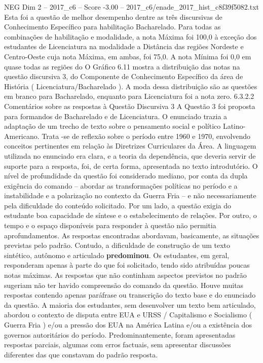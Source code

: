 \begin{textsample}{NEG Dim 2 – 2017\_c6 – Score -3.00 – 2017\_c6/enade\_2017\_hist\_c8f39f5082.txt}
Esta foi a questão de melhor desempenho dentre as três discursivas de Conhecimento Específico para habilitação Bacharelado.
Para todas as combinações de habilitação e modalidade, a nota Máxima foi 100,0 à exceção dos estudantes de Licenciatura na modalidade a Distância das regiões Nordeste e Centro-Oeste cuja nota Máxima, em ambas, foi 75,0.
A nota Mínima foi 0,0 em quase todas as regiões do O Gráfico 6.11 mostra a distribuição das notas na questão discursiva 3, do Componente de Conhecimento Específico da área de História ( Licenciatura/Bacharelado ).
A moda dessa distribuição são as questões em branco para Bacharelado, enquanto para Licenciatura foi a nota zero. 6.3.2.2 Comentários sobre as respostas à Questão Discursiva 3 A Questão 3 foi proposta para formandos de Bacharelado e de Licenciatura.
O enunciado trazia a adaptação de um trecho de texto sobre o pensamento social e político Latino-Americano.
Trata -se de reflexão sobre o período entre 1960 e 1970, envolvendo conceitos pertinentes em relação às Diretrizes Curriculares da Área.
A linguagem utilizada no enunciado era clara, e a teoria da dependência, que deveria servir de suporte para a resposta, foi, de certa forma, apresentada no texto introdutório.
O nível de profundidade da questão foi considerado mediano, por conta da dupla exigência do comando – abordar as transformações políticas no período e a instabilidade e a polarização no contexto da Guerra Fria – e não necessariamente pela dificuldade do conteúdo solicitado.
Por um lado, a questão exigia do estudante boa capacidade de síntese e o estabelecimento de relações.
Por outro, o tempo e o espaço disponíveis para responder à questão não permitia aprofundamentos.
As respostas encontradas abordavam, basicamente, as situações previstas pelo padrão.
Contudo, a dificuldade de construção de um texto sintético, autônomo e articulado \textbf{predominou}.
Os estudantes, em geral, responderam apenas à parte do que foi solicitado, tendo sido atribuídas poucas notas máximas.
As respostas que não continham aspectos previstos no padrão sugeriam não ter havido compreensão do comando da questão.
Houve muitas respostas contendo apenas paráfrase ou transcrição do texto base e do enunciado da questão.
A maioria dos estudantes, sem desenvolver um texto bem articulado, abordou o contexto de disputa entre EUA e URSS / Capitalismo e Socialismo ( Guerra Fria ) e/ou a pressão dos EUA na América Latina e/ou a existência dos governos autoritários do período.
Predominantemente, foram apresentadas respostas parciais, algumas com erros factuais, sem apresentar discussões diferentes das que constavam do padrão resposta.

\end{textsample}
